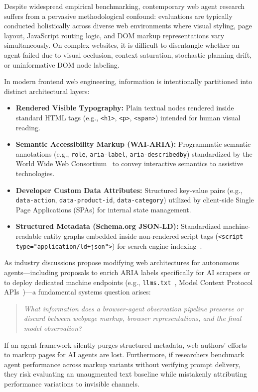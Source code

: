 \documentclass[11pt,a4paper]{article}
\begin{document}
Despite widespread empirical benchmarking, contemporary web agent research suffers from a pervasive methodological confound: evaluations are typically conducted holistically across diverse web environments where visual styling, page layout, JavaScript routing logic, and DOM markup representations vary simultaneously. On complex websites, it is difficult to disentangle whether an agent failed due to visual occlusion, context saturation, stochastic planning drift, or uninformative DOM node labeling.

In modern frontend web engineering, information is intentionally partitioned into distinct architectural layers:
\begin{itemize}
    \item \textbf{Rendered Visible Typography:} Plain textual nodes rendered inside standard HTML tags (e.g., \texttt{<h1>}, \texttt{<p>}, \texttt{<span>}) intended for human visual reading.
    \item \textbf{Semantic Accessibility Markup (WAI-ARIA):} Programmatic semantic annotations (e.g., \texttt{role}, \texttt{aria-label}, \texttt{aria-describedby}) standardized by the World Wide Web Consortium~\cite{wai_aria12, accname11} to convey interactive semantics to assistive technologies.
    \item \textbf{Developer Custom Data Attributes:} Structured key-value pairs (e.g., \texttt{data-action}, \texttt{data-product-id}, \texttt{data-category}) utilized by client-side Single Page Applications (SPAs) for internal state management.
    \item \textbf{Structured Metadata (Schema.org JSON-LD):} Standardized machine-readable entity graphs embedded inside non-rendered script tags (\texttt{<script type="application/ld+json">}) for search engine indexing~\cite{schemaorg}.
\end{itemize}

As industry discussions propose modifying web architectures for autonomous agents---including proposals to enrich ARIA labels specifically for AI scrapers or to deploy dedicated machine endpoints (e.g., \texttt{llms.txt}~\cite{llmstxt2024}, Model Context Protocol APIs~\cite{mcp2024})---a fundamental systems question arises:
\begin{quote}
\textit{What information does a browser-agent observation pipeline preserve or discard between webpage markup, browser representations, and the final model observation?}
\end{quote}

If an agent framework silently purges structured metadata, web authors' efforts to markup pages for AI agents are lost. Furthermore, if researchers benchmark agent performance across markup variants without verifying prompt delivery, they risk evaluating an unaugmented text baseline while mistakenly attributing performance variations to invisible channels. 
\end{document}
